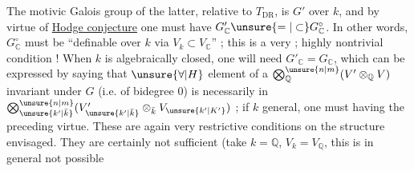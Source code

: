 The motivic Galois group of the latter, relative to $T_{\mathrm{DR}}$, is    $G'$  over $k$,  and by virtue of \uline{Hodge conjecture} one must have $G'_{\mathbb C}\unsure{=|\subset}G^\circ_{\mathbb C}$.  In other words, $G^\circ_{\mathbb C}$ must be ``definable over $k$ via $V_k\subset V_{\mathbb C}$'' ; this is a very ; highly nontrivial condition ! When $k$ is algebraically closed, one will need  $G'_{\mathbb C}=G_{\mathbb C}$, which can be expressed by saying that $\unsure{\forall|H}$  element of a ${\bigotimes}_{\mathbb Q}^{\unsure{n|m}}(V'\otimes_{\mathbb Q}V)$ invariant under $G$ (i.e. of bidegree $0$) is necessarily in $\bigotimes_{\unsure{k'|\bar k}}^{\unsure{n|m}}(V'_{\unsure{k'|\bar k}}\otimes_{\bar k}V_{\unsure{k'|K'}})$\unsure{!} ; if $k$ general, one must   having the preceding virtue. These are again very restrictive conditions on the structure envisaged. They are certainly not sufficient (take $k=\mathbb Q$, $V_k=V_{\mathbb Q}$, this is in general not possible
{\centering \textsc{}\\
\textit{ }\par}
